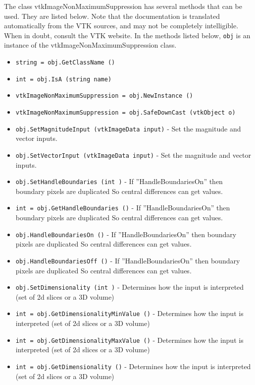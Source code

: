 The class vtkImageNonMaximumSuppression has several methods that can be used.
  They are listed below.
Note that the documentation is translated automatically from the VTK sources,
and may not be completely intelligible.  When in doubt, consult the VTK website.
In the methods listed below, \verb|obj| is an instance of the vtkImageNonMaximumSuppression class.
\begin{itemize}
\item  \verb|string = obj.GetClassName ()|

\item  \verb|int = obj.IsA (string name)|

\item  \verb|vtkImageNonMaximumSuppression = obj.NewInstance ()|

\item  \verb|vtkImageNonMaximumSuppression = obj.SafeDownCast (vtkObject o)|

\item  \verb|obj.SetMagnitudeInput (vtkImageData input)| -  Set the magnitude and vector inputs.

\item  \verb|obj.SetVectorInput (vtkImageData input)| -  Set the magnitude and vector inputs.

\item  \verb|obj.SetHandleBoundaries (int )| -  If ''HandleBoundariesOn'' then boundary pixels are duplicated
 So central differences can get values.

\item  \verb|int = obj.GetHandleBoundaries ()| -  If ''HandleBoundariesOn'' then boundary pixels are duplicated
 So central differences can get values.

\item  \verb|obj.HandleBoundariesOn ()| -  If ''HandleBoundariesOn'' then boundary pixels are duplicated
 So central differences can get values.

\item  \verb|obj.HandleBoundariesOff ()| -  If ''HandleBoundariesOn'' then boundary pixels are duplicated
 So central differences can get values.

\item  \verb|obj.SetDimensionality (int )| -  Determines how the input is interpreted (set of 2d slices or a 3D volume)

\item  \verb|int = obj.GetDimensionalityMinValue ()| -  Determines how the input is interpreted (set of 2d slices or a 3D volume)

\item  \verb|int = obj.GetDimensionalityMaxValue ()| -  Determines how the input is interpreted (set of 2d slices or a 3D volume)

\item  \verb|int = obj.GetDimensionality ()| -  Determines how the input is interpreted (set of 2d slices or a 3D volume)

\end{itemize}
